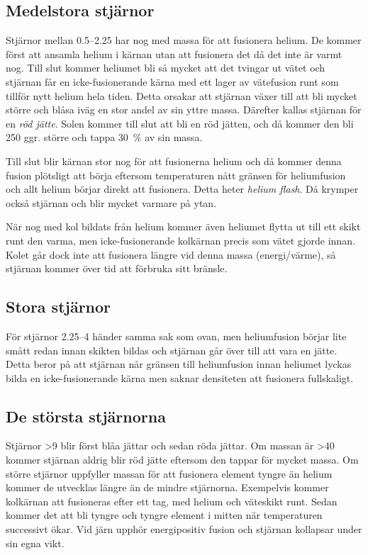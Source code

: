 \subsection{Medelstora stjärnor}
Stjärnor mellan \qtyrange{0.5}{2.25}{\Mo} har nog med massa för att fusionera helium. De kommer först att ansamla helium i kärnan utan att fusionera det då det inte är varmt nog. Till slut kommer heliumet bli så mycket att det tvingar ut vätet och stjärnan får en icke-fusionerande kärna med ett lager av vätefusion runt som tillför nytt helium hela tiden. Detta orsakar att stjärnan växer till att bli mycket större och blåsa iväg en stor andel av sin yttre massa. Därefter kallas stjärnan för en \emph{röd jätte}. Solen kommer till slut att bli en röd jätten, och då kommer den bli \num{250} ggr. större och tappa \qty{30}{\percent} av sin massa.

Till slut blir kärnan stor nog för att fusionerna helium och då kommer denna fusion plötsligt att börja eftersom temperaturen nått gränsen för heliumfusion och allt helium börjar direkt att fusionera. Detta heter \emph{helium flash}. Då krymper också stjärnan och blir mycket varmare på ytan.

När nog med kol bildats från helium kommer även heliumet flytta ut till ett skikt runt den varma, men icke-fusionerande kolkärnan precis som vätet gjorde innan. Kolet går dock inte att fusionera längre vid denna massa (energi/värme), så stjärnan kommer över tid att förbruka sitt bränsle.

\subsection{Stora stjärnor}
För stjärnor \qtyrange{2.25}{4}{\Mo} händer samma sak som ovan, men heliumfusion börjar lite smått redan innan skikten bildas och stjärnan går över till att vara en jätte. Detta beror på att stjärnan når gränsen till heliumfusion innan heliumet lyckas bilda en icke-fusionerande kärna men saknar densiteten att fusionera fullskaligt.

\subsection{De största stjärnorna}
Stjärnor \qty{>9}{\Mo} blir först blåa jättar och sedan röda jättar. Om massan är \qty{>40}{\Mo} kommer stjärnan aldrig blir röd jätte eftersom den tappar för mycket massa. Om större stjärnor uppfyller massan för att fusionera element tyngre än helium kommer de utvecklas längre än de mindre stjärnorna. Exempelvis kommer kolkärnan att fusioneras efter ett tag, med helium och väteskikt runt. Sedan kommer det att bli tyngre och tyngre element i mitten när temperaturen successivt ökar. Vid järn upphör energipositiv fusion och stjärnan kollapsar under sin egna vikt.

